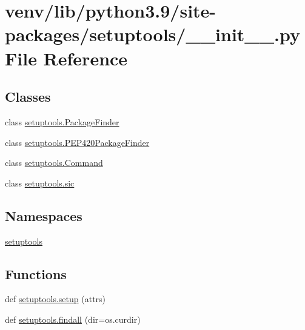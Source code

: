 \hypertarget{venv_2lib_2python3_89_2site-packages_2setuptools_2____init_____8py}{}\section{venv/lib/python3.9/site-\/packages/setuptools/\+\_\+\+\_\+init\+\_\+\+\_\+.py File Reference}
\label{venv_2lib_2python3_89_2site-packages_2setuptools_2____init_____8py}
\subsection*{Classes}
\begin{DoxyCompactItemize}
\item 
class \hyperlink{classsetuptools_1_1PackageFinder}{setuptools.\+Package\+Finder}
\item 
class \hyperlink{classsetuptools_1_1PEP420PackageFinder}{setuptools.\+P\+E\+P420\+Package\+Finder}
\item 
class \hyperlink{classsetuptools_1_1Command}{setuptools.\+Command}
\item 
class \hyperlink{classsetuptools_1_1sic}{setuptools.\+sic}
\end{DoxyCompactItemize}
\subsection*{Namespaces}
\begin{DoxyCompactItemize}
\item 
 \hyperlink{namespacesetuptools}{setuptools}
\end{DoxyCompactItemize}
\subsection*{Functions}
\begin{DoxyCompactItemize}
\item 
def \hyperlink{namespacesetuptools_ad048bb82cb20bf61541da45950f1f4cb}{setuptools.\+setup} (attrs)
\item 
def \hyperlink{namespacesetuptools_a9d3e6b5f82f1d22fb1d7ad0daf6018f6}{setuptools.\+findall} (dir=os.\+curdir)
\end{DoxyCompactItemize}
